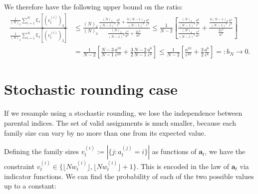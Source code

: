 \documentclass[fleqn]{article}
\theoremstyle{definition}
\newcommand{\E}{\mathbb{E}}
\newcommand{\1}[1]{\mathbbm{1}_{\{#1\}}}
\newcommand{\vt}[2][t]{v_{#1}^{(#2)}}
\newcommand{\wt}[2][t]{w_{#1}^{(#2)}}
\newcommand{\flnw}{\lfloor N\wt{i} \rfloor }
\begin{document}
We therefore have the following upper bound on the ratio:
\begin{align*}
\frac{\frac{1}{(N)_3} \sum_{i=1}^N \E_t[(\vt{i})_3]}{\frac{1}{(N)_2} \sum_{i=1}^N \E_t[(\vt{i})_2]}
&\leq \frac{(N)_2}{(N)_3} \frac{\frac{(N)_4}{(N-1)^3} \frac{a^6}{\varepsilon^6} + \frac{3(N-1)_2}{(N-1)^2} \frac{a^4}{\varepsilon^4}}{\frac{(N)_3}{(N-1)^2}\frac{\varepsilon^4}{a^4} + \frac{2\varepsilon^2}{a^2}}
\leq \frac{1}{N-2} \left[ \frac{\frac{(N)_4}{(N-1)^3} \frac{a^6}{\varepsilon^6} }{\frac{(N)_3}{(N-1)^2}\frac{\varepsilon^4}{a^4} } 
+ \frac{ \frac{3(N-1)_2}{(N-1)^2} \frac{a^4}{\varepsilon^4}}{\frac{2\varepsilon^2}{a^2}} \right] \\
&= \frac{1}{N-2} \left[ \frac{N-3}{N-1} \frac{a^{10}}{\varepsilon^{10}} + \frac{3}{2} \frac{N-2}{N-1} \frac{a^6}{\varepsilon^6} \right]
\leq \frac{1}{N-2} \left[ \frac{a^{10}}{\varepsilon^{10}} + \frac{3}{2} \frac{a^6}{\varepsilon^6} \right] =:b_N \to 0.
\end{align*}

\section*{Stochastic rounding case}
If we resample using a stochastic rounding, we lose the independence between parental indices. The set of valid assignments is much smaller, because each family size can vary by no more than one from its expected value.

Defining the family sizes $\vt{i} := |\{ j : a_t^{(j)} = i \}|$ as functions of $\mathbf{a}_t$, we have the constraint $\vt{i} \in \{\flnw, \flnw +1\}$. This is encoded in the law of $\mathbf{a}_t$ via indicator functions. We can find the probability of each of the two possible values up to a constant:
\end{document}
